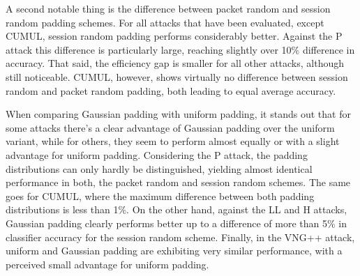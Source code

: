 \documentclass[
	ruledheaders=chapter,
	class=report,
	thesis={type=master, department=inf},
	accentcolor=1c,
	custommargins=true,
	marginpar=false,
	parskip=half-,
	fontsize=11pt,
]{tudapub}
\begin{document}
	A second notable thing is the difference between packet random and session random padding schemes. For all attacks that have been evaluated, except CUMUL, session random padding performs considerably better. Against the P attack this difference is particularly large, reaching slightly over 10\% difference in accuracy. That said, the efficiency gap is smaller for all other attacks, although still noticeable. CUMUL, however, shows virtually no difference between session random and packet random padding, both leading to equal average accuracy.
	
	When comparing Gaussian padding with uniform padding, it stands out that for some attacks there's a clear advantage of Gaussian padding over the uniform variant, while for others, they seem to perform almost equally or with a slight advantage for uniform padding. Considering the P attack, the padding distributions can only hardly be distinguished, yielding almost identical performance in both, the packet random and session random schemes. The same goes for CUMUL, where the maximum difference between both padding distributions is less than 1\%. On the other hand, against the LL and H attacks, Gaussian padding clearly performs better up to a difference of more than 5\% in classifier accuracy for the session random scheme. Finally, in the VNG++ attack, uniform and Gaussian padding are exhibiting very similar performance, with a perceived small advantage for uniform padding.
\end{document}
